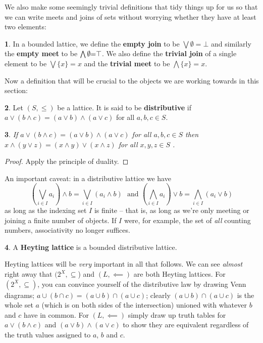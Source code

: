 \documentclass[oneside,english]{amsbook}
\numberwithin{section}{chapter}
\theoremstyle{plain}
\newtheorem{thm}{\protect\theoremname}
\theoremstyle{definition}
\newtheorem{defn}[thm]{\protect\definitionname}
\providecommand{\definitionname}{Definition}
\providecommand{\theoremname}{Theorem}
\begin{document}
We also make some seemingly trivial definitions that tidy things up for us so that we can write meets and joins of sets without worrying whether they have at least two elements: 

\begin{defn} 
	In a bounded lattice, we define the \textbf{empty join }to be $\bigvee\emptyset=\bot$ and similarly the \textbf{empty meet }to be $\text{\ensuremath{\bigwedge\emptyset}=\ensuremath{\top}}$. We also define the \textbf{trivial join }of a single element to be $\bigvee\{x\}=x$ and the \textbf{trivial meet }to be $\bigwedge\{x\}=x$. 
\end{defn} 

Now a definition that will be crucial to the objects we are working towards in this section: 

\begin{defn} 
	Let $(S,\le)$ be a lattice. It is said to be \textbf{distributive} if $a\lor(b\land c)=(a\lor b)\land(a\lor c)$ for all $a,b,c\in S$.
\end{defn} 

\begin{thm} 
	If $a\lor(b\land c)=(a\lor b)\land(a\lor c)$ for all $a,b,c\in S$ then $x\land(y\lor z)=(x\land y)\lor(x\land z)$ for all $x,y,z\in S$ .
\end{thm} 
\begin{proof} 
	Apply the principle of duality. 
\end{proof} 

An important caveat: in a distributive lattice we have 
	\[ 
		(\bigvee_{i\in I}a_{i})\land b=\bigvee_{i\in I}(a_{i}\land b)\ \ \ \text{and\ \ \  }(\bigwedge_{i\in I}a_{i})\lor b=\bigwedge_{i\in I}(a_{i}\lor b) 
	\]
as long as the indexing set $I$ is finite -- that is, as long as we're only meeting or joining a finite number of objects. If $I$ were, for example, the set of \emph{all }counting numbers, associativity no longer suffices. 

\begin{defn} 
	A \textbf{Heyting lattice} is a bounded distributive lattice. 
\end{defn} 

Heyting lattices will be \emph{very} important in all that follows. We can see \emph{almost }right away that $(2^{X},\subseteq$) and $(L,\impliedby)$ are both Heyting lattices. For $(2^{X},\subseteq)$, you can convince yourself of the distributive law by drawing Venn diagrams; $a\cup(b\cap c)=(a\cup b)\cap(a\cup c)$; clearly $(a\cup b)\cap(a\cup c)$ is the whole set $a$ (which is on both sides of the intersection) unioned with whatever $b$ and $c$ have in common. For $(L,\impliedby)$ simply draw up truth tables for $a\lor(b\land c)$ and $(a\lor b)\land(a\lor c)$ to show they are equivalent regardless of the truth values assigned to $a$, $b$ and $c$.
\end{document}
